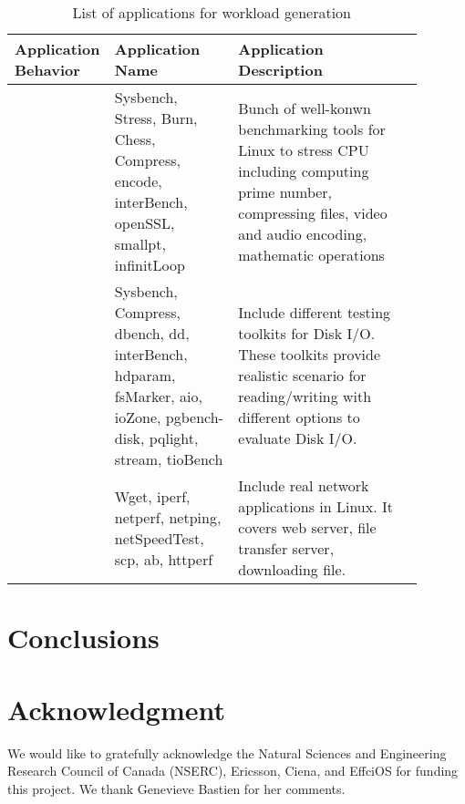 \documentclass[10pt, conference, compsocconf]{IEEEtran}
\begin{document}
\begin{table}
\caption{List of applications for workload generation}
\centering
\begin{tabular}{M{0.14\linewidth}M{0.30\linewidth}M{0.45\linewidth}}
  \hline
  \footnotesize \textbf{Application Behavior} & \footnotesize \textbf{Application Name} & \footnotesize \textbf{Application Description} \\
  \hline
  \hline
    \footnotesize {} & \footnotesize Sysbench, Stress, Burn, Chess, Compress, encode, interBench, openSSL, smallpt, infinitLoop  & Bunch of well-konwn benchmarking tools for Linux to stress CPU including computing prime number, compressing files, video and audio encoding, mathematic operations \\  \hline
  \footnotesize  {} & \footnotesize Sysbench, Compress, dbench, dd, interBench, hdparam, fsMarker, aio, ioZone, pgbench-disk, pqlight, stream, tioBench & Include different testing toolkits for Disk I/O. These toolkits provide realistic scenario for reading/writing with different options to evaluate Disk I/O.  \\  \hline
   \footnotesize  {} & \footnotesize  Wget, iperf, netperf, netping, netSpeedTest, scp, ab, httperf & Include real network applications in Linux. It covers web server, file transfer server, downloading file.    \\
  \hline
\end{tabular}
\label{tab:notation}
\end{table}





\section{Conclusions}






\section*{Acknowledgment}

We would like to gratefully acknowledge the Natural Sciences and Engineering Research Council of Canada (NSERC), Ericsson, Ciena, and EffciOS for funding this project. We thank Genevieve Bastien for her comments.





\end{document}
